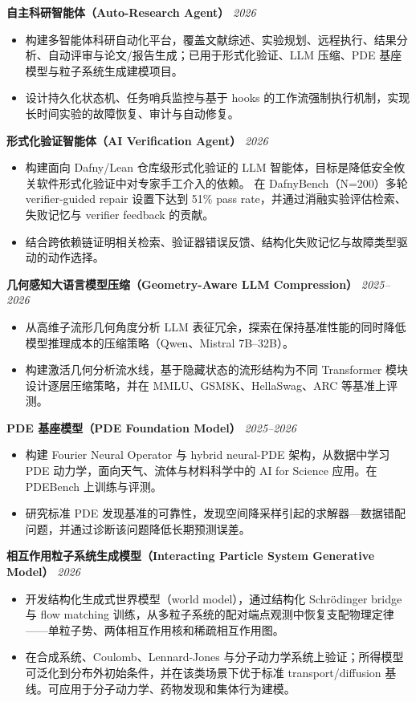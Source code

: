 \documentclass[11pt]{ctexart}
\newcommand{\proj}[2]{%
\Needspace{4\baselineskip}%
\textbf{#1} \hfill {\em #2}\par
}
\begin{document}
\proj{自主科研智能体（Auto-Research Agent）}{2026}
\begin{itemize}[leftmargin=1.2em, itemsep=-2pt]
  \item 构建多智能体科研自动化平台，覆盖文献综述、实验规划、远程执行、结果分析、自动评审与论文/报告生成；已用于形式化验证、LLM 压缩、PDE 基座模型与粒子系统生成建模项目。
  \item 设计持久化状态机、任务哨兵监控与基于 hooks 的工作流强制执行机制，实现长时间实验的故障恢复、审计与自动修复。
\end{itemize}

\proj{形式化验证智能体（AI Verification Agent）}{2026}
\begin{itemize}[leftmargin=1.2em, itemsep=-2pt]
  \item 构建面向 Dafny/Lean 仓库级形式化验证的 LLM 智能体，目标是降低安全攸关软件形式化验证中对专家手工介入的依赖。
在 DafnyBench（N=200）多轮 verifier-guided repair 设置下达到 51\% pass rate，并通过消融实验评估检索、失败记忆与 verifier feedback 的贡献。
  \item 结合跨依赖链证明相关检索、验证器错误反馈、结构化失败记忆与故障类型驱动的动作选择。
\end{itemize}

\proj{几何感知大语言模型压缩（Geometry-Aware LLM Compression）}{2025--2026}
\begin{itemize}[leftmargin=1.2em, itemsep=-2pt]
  \item 从高维子流形几何角度分析 LLM 表征冗余，探索在保持基准性能的同时降低模型推理成本的压缩策略（Qwen、Mistral 7B--32B）。
  \item 构建激活几何分析流水线，基于隐藏状态的流形结构为不同 Transformer 模块设计逐层压缩策略，并在 MMLU、GSM8K、HellaSwag、ARC 等基准上评测。
\end{itemize}

\proj{PDE 基座模型（PDE Foundation Model）}{2025--2026}
\begin{itemize}[leftmargin=1.2em, itemsep=-2pt]
  \item 构建 Fourier Neural Operator 与 hybrid neural-PDE 架构，从数据中学习 PDE 动力学，面向天气、流体与材料科学中的 AI for Science 应用。在 PDEBench 上训练与评测。
  \item 研究标准 PDE 发现基准的可靠性，发现空间降采样引起的求解器—数据错配问题，并通过诊断该问题降低长期预测误差。
\end{itemize}

\proj{相互作用粒子系统生成模型（Interacting Particle System Generative Model）}{2026}
\begin{itemize}[leftmargin=1.2em, itemsep=-2pt]
  \item 开发结构化生成式世界模型（world model），通过结构化 Schr\"odinger bridge 与 flow matching 训练，从多粒子系统的配对端点观测中恢复支配物理定律——单粒子势、两体相互作用核和稀疏相互作用图。
  \item 在合成系统、Coulomb、Lennard-Jones 与分子动力学系统上验证；所得模型可泛化到分布外初始条件，并在该类场景下优于标准 transport/diffusion 基线。可应用于分子动力学、药物发现和集体行为建模。
\end{itemize}
\end{document}
